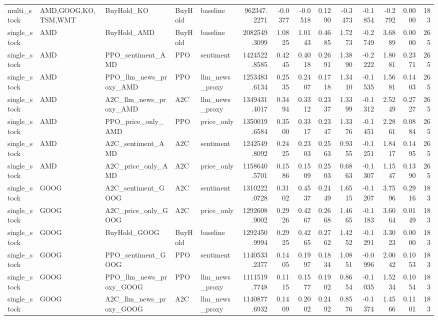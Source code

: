\begin{tabular}{lllllrrrrrrrrr}
multi_stock & AMD,GOOG,KO,TSM,WMT & BuyHold_KO & BuyHold & baseline & 962347.2271 & -0.0377 & -0.0518 & 0.1290 & -0.3473 & -0.1854 & -0.2792 & 0.0000 & 183 \\
single_stock & AMD & BuyHold_AMD & BuyHold & baseline & 2082549.3099 & 1.0825 & 1.0143 & 0.4685 & 1.7273 & -0.2749 & 3.6889 & 0.0000 & 265 \\
single_stock & AMD & PPO_sentiment_AMD & PPO & sentiment & 1424522.8585 & 0.4245 & 0.4018 & 0.2691 & 1.3890 & -0.2222 & 1.8081 & 0.2371 & 265 \\
single_stock & AMD & PPO_llm_news_proxy_AMD & PPO & llm_news_proxy & 1253483.6134 & 0.2535 & 0.2407 & 0.1718 & 1.3410 & -0.1535 & 1.5681 & 0.1403 & 265 \\
single_stock & AMD & A2C_llm_news_proxy_AMD & A2C & llm_news_proxy & 1349431.4017 & 0.3494 & 0.3312 & 0.2337 & 1.3399 & -0.1312 & 2.5249 & 0.2727 & 265 \\
single_stock & AMD & PPO_price_only_AMD & PPO & price_only & 1350019.6584 & 0.3500 & 0.3317 & 0.2347 & 1.3376 & -0.1451 & 2.2861 & 0.0884 & 265 \\
single_stock & AMD & A2C_sentiment_AMD & A2C & sentiment & 1242549.8092 & 0.2425 & 0.2303 & 0.2563 & 0.9355 & -0.1251 & 1.8417 & 0.1495 & 265 \\
single_stock & AMD & A2C_price_only_AMD & A2C & price_only & 1158640.5701 & 0.1586 & 0.1509 & 0.2503 & 0.6863 & -0.1307 & 1.1547 & 0.1390 & 265 \\
single_stock & GOOG & A2C_sentiment_GOOG & A2C & sentiment & 1310222.0728 & 0.3102 & 0.4537 & 0.2449 & 1.6515 & -0.1207 & 3.7596 & 0.2916 & 183 \\
single_stock & GOOG & A2C_price_only_GOOG & A2C & price_only & 1292608.9002 & 0.2926 & 0.4267 & 0.2668 & 1.4665 & -0.1183 & 3.6064 & 0.0149 & 183 \\
single_stock & GOOG & BuyHold_GOOG & BuyHold & baseline & 1292450.9994 & 0.2925 & 0.4265 & 0.2762 & 1.4252 & -0.1291 & 3.3023 & 0.0000 & 183 \\
single_stock & GOOG & PPO_sentiment_GOOG & PPO & sentiment & 1140533.2377 & 0.1405 & 0.1997 & 0.1834 & 1.0851 & -0.0996 & 2.0042 & 0.1053 & 183 \\
single_stock & GOOG & PPO_llm_news_proxy_GOOG & PPO & llm_news_proxy & 1111519.7748 & 0.1115 & 0.1577 & 0.1902 & 0.8654 & -0.1035 & 1.5234 & 0.1054 & 183 \\
single_stock & GOOG & A2C_llm_news_proxy_GOOG & A2C & llm_news_proxy & 1140877.6932 & 0.1409 & 0.2002 & 0.2492 & 0.8576 & -0.1374 & 1.4566 & 0.1101 & 183 \\

\end{tabular}
